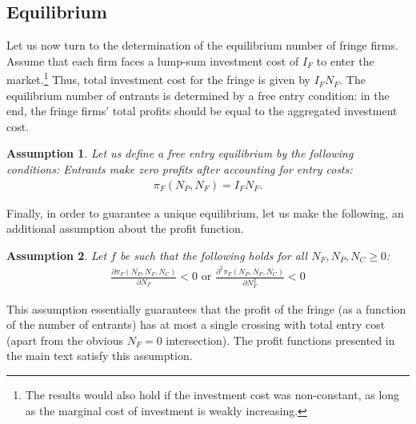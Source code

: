 \documentclass[a4paper]{article}
\newtheorem{assumption}{Assumption}
\begin{document}
\subsection{Equilibrium}
\label{sec:more_general_equilibrium}

Let us now turn to the determination of the equilibrium number of fringe firms.
Assume that each firm faces a lump-sum investment cost of $I_F$ to enter the market.\footnote{
    The results would also hold if the investment cost was non-constant, as long as the marginal cost of investment is weakly increasing.
}
Thus, total investment cost for the fringe is given by $I_F N_F$.
The equilibrium number of entrants is determined by a free entry condition: in the end, the fringe firms' total profits should be equal to the aggregated investment cost.
\begin{assumption}
    \label{ass:free_entry}
    Let us define a free entry equilibrium by the following conditions: Entrants make zero profits after accounting for entry costs: 
    \begin{align*}
        \pi_F(N_P, N_F) = I_F N_F.
    \end{align*}
\end{assumption}

Finally, in order to guarantee a unique equilibrium, let us make the following, an additional assumption about the profit function.
\begin{assumption}
    \label{ass:single_crossing}
    Let $f$ be such that the following holds for all $N_F, N_P, N_C \geq 0$:
    \begin{align*}
        \frac{\partial \pi_F(N_P, N_F, N_C)}{\partial N_F} < 0 \text{ or } \frac{\partial^2 \pi_F(N_P, N_F, N_C)}{\partial N_F^2} < 0
    \end{align*}
\end{assumption}
This assumption essentially guarantees that the profit of the fringe (as a function of the number of entrants) has at most a single crossing with total entry cost (apart from the obvious $N_F=0$ intersection).
The profit functions presented in the main text satisfy this assumption.
\end{document}
